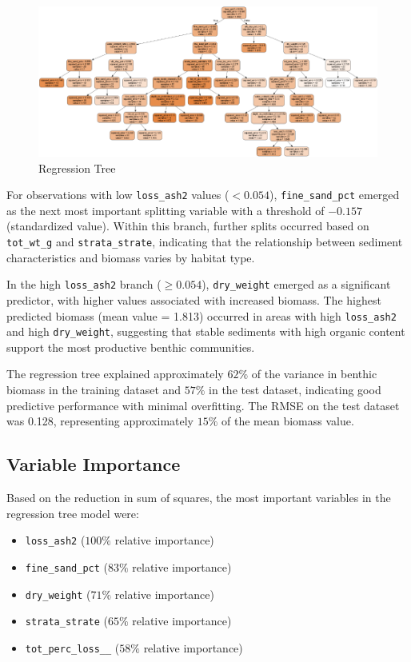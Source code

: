 \documentclass[12pt]{article}
\begin{document}
\begin{figure}[h!]
\centering
\includegraphics[scale=1]{Regression-tree}
\caption{Regression Tree}
\label{fig:regression-tree}
\end{figure}

\qquad For observations with low \texttt{loss\_ash2} values ($<0.054$), \texttt{fine\_sand\_pct} emerged as the next most important splitting variable with a threshold of $-0.157$ (standardized value). Within this branch, further splits occurred based on \texttt{tot\_wt\_g} and \texttt{strata\_strate}, indicating that the relationship between sediment characteristics and biomass varies by habitat type.

\qquad In the high \texttt{loss\_ash2} branch ($\geq0.054$), \texttt{dry\_weight} emerged as a significant predictor, with higher values associated with increased biomass. The highest predicted biomass (mean value = 1.813) occurred in areas with high \texttt{loss\_ash2} and high \texttt{dry\_weight}, suggesting that stable sediments with high organic content support the most productive benthic communities.

\qquad The regression tree explained approximately $62\%$ of the variance in benthic biomass in the training dataset and $57\%$ in the test dataset, indicating good predictive performance with minimal overfitting. The RMSE on the test dataset was 0.128, representing approximately $15\%$ of the mean biomass value.

\subsection{Variable Importance}

\qquad Based on the reduction in sum of squares, the most important variables in the regression tree model were:

\begin{itemize}
    \item \texttt{loss\_ash2} ($100\%$ relative importance)
    \item \texttt{fine\_sand\_pct} ($83\%$ relative importance)
    \item \texttt{dry\_weight} ($71\%$ relative importance)
    \item \texttt{strata\_strate} ($65\%$ relative importance)
    \item \texttt{tot\_perc\_loss\_\_} ($58\%$ relative importance)
\end{itemize}
\end{document}

